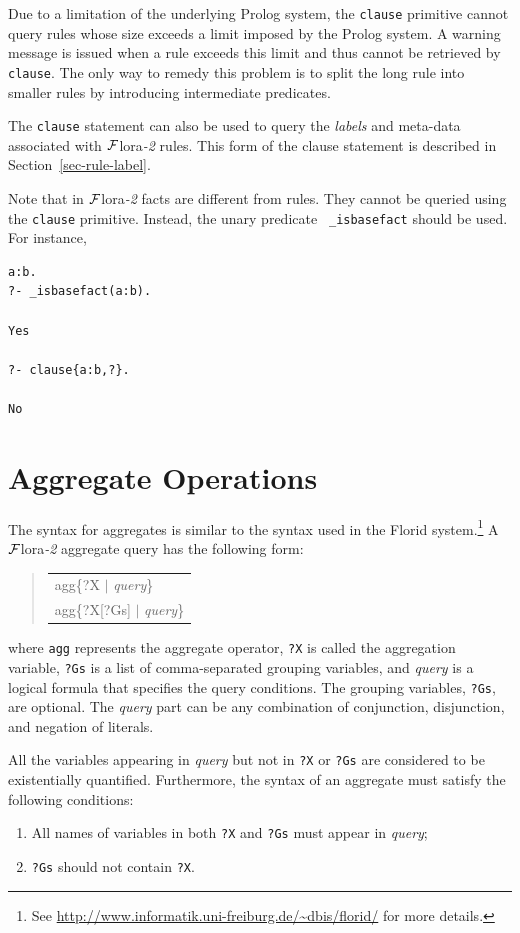 \documentclass[11pt]{article}
\newenvironment{qrules}{\begin{quote}\tt\begin{tabular}[t]{l}}%
{\end{tabular}\end{quote}}
\newcommand{\FLORA}{{\mbox{\sc ${\cal F}${lora}\rm\emph{-2}}}\xspace}
\newcommand{\FLORID}{{\mbox{\sc Florid}}\xspace}
\begin{document}
Due to a limitation of the underlying Prolog system, the {\tt clause}
primitive cannot query rules whose size exceeds a limit imposed by the
Prolog system.  A warning message is issued when a rule exceeds this limit
and thus cannot be retrieved by {\tt clause}.  The only way to remedy this
problem is to split the long rule into smaller rules by introducing
intermediate predicates.

The {\tt clause} statement can also be used to query the \emph{labels} and
meta-data associated with \FLORA rules. This form of the clause statement
is described in Section~\ref{sec-rule-label}.

Note that in \FLORA facts are different from rules. They cannot be queried
using the {\tt clause} primitive. Instead, the unary predicate {\tt
  \_isbasefact} should be used. For instance,
\begin{verbatim}
a:b.
?- _isbasefact(a:b).

Yes

?- clause{a:b,?}.

No
\end{verbatim}


\section{Aggregate Operations}
\label{sec-aggregates}


The syntax for aggregates is similar to the syntax used in the \FLORID
system.\footnote{
  See \url{http://www.informatik.uni-freiburg.de/~dbis/florid/} for more
  details.
}
A \FLORA aggregate query has the following form:
\begin{qrules}
agg\{?X $|$ {\it query}\}\\
agg\{?X[?Gs] $|$ {\it query}\}
\end{qrules}
%
where {\tt agg} represents the aggregate operator, {\tt ?X} is called the
aggregation variable, {\tt ?Gs} is a list of comma-separated grouping
variables, and {\it query} is a logical formula that specifies the
query conditions. The grouping variables, {\tt ?Gs}, are optional. The {\it
query} part
can be any combination of conjunction, disjunction, and negation of literals.

All the variables appearing in {\it query} but not in {\tt ?X} or {\tt ?Gs} are
considered to be existentially quantified. Furthermore, the syntax of an
aggregate must satisfy the following conditions:
\begin{enumerate}
\item All names of variables in both {\tt ?X} and {\tt ?Gs} must
appear in {\it query};
\item {\tt ?Gs} should not contain {\tt ?X}.
\end{enumerate}
\end{document}

